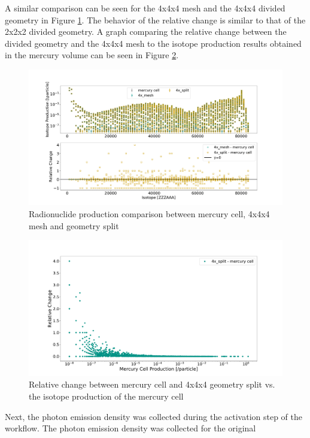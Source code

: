 A similar comparison can be seen for the 4x4x4 mesh and the 4x4x4 divided
geometry in Figure \ref{fig:1prod_cell_4x}. The behavior of the relative change
is similar to that of the 2x2x2 divided geometry. A graph comparing the relative
change between the divided geometry and the 4x4x4 mesh  to the isotope
production results obtained in the mercury volume can be seen in Figure
\ref{fig:1prod_cell_4x_rc}.
%
\begin{figure}[H]
	\centering
	\includegraphics[scale=0.42,trim={2cm 1cm 3cm 2cm},clip]{../figs/toy_p1/prod_VPI_4x.pdf}
	\caption{Radionuclide production comparison between mercury cell, 4x4x4 mesh and geometry split}
	\label{fig:1prod_cell_4x}
\end{figure}
%
\begin{figure}[H]
 \centering
 \includegraphics[scale=0.4,trim={3cm 0.5cm 3cm 3cm},clip]{../figs/toy_p1/prod_VPI_rc_4x_split.pdf}
 \caption{Relative change between mercury cell and 4x4x4 geometry split vs. the isotope production of the mercury cell}
 \label{fig:1prod_cell_4x_rc}
\end{figure}
%
Next, the photon emission density was collected during the activation step of
the workflow. The photon emission density was collected for the original
